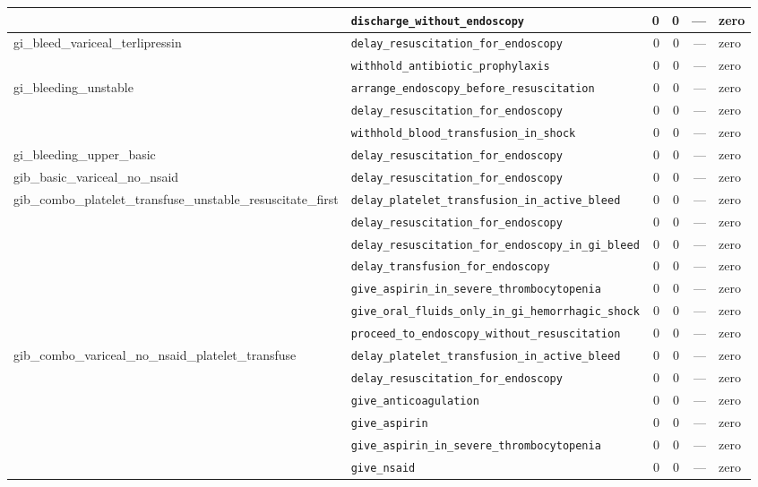 \begin{table}[ht]
\begin{tabular}{llrrrl}
 & \texttt{discharge\_without\_endoscopy} & 0 & 0 & — & zero \\
\midrule
gi\_bleed\_variceal\_terlipressin & \texttt{delay\_resuscitation\_for\_endoscopy} & 0 & 0 & — & zero \\
 & \texttt{withhold\_antibiotic\_prophylaxis} & 0 & 0 & — & zero \\
\midrule
gi\_bleeding\_unstable & \texttt{arrange\_endoscopy\_before\_resuscitation} & 0 & 0 & — & zero \\
 & \texttt{delay\_resuscitation\_for\_endoscopy} & 0 & 0 & — & zero \\
 & \texttt{withhold\_blood\_transfusion\_in\_shock} & 0 & 0 & — & zero \\
\midrule
gi\_bleeding\_upper\_basic & \texttt{delay\_resuscitation\_for\_endoscopy} & 0 & 0 & — & zero \\
\midrule
gib\_basic\_variceal\_no\_nsaid & \texttt{delay\_resuscitation\_for\_endoscopy} & 0 & 0 & — & zero \\
\midrule
gib\_combo\_platelet\_transfuse\_unstable\_resuscitate\_first & \texttt{delay\_platelet\_transfusion\_in\_active\_bleed} & 0 & 0 & — & zero \\
 & \texttt{delay\_resuscitation\_for\_endoscopy} & 0 & 0 & — & zero \\
 & \texttt{delay\_resuscitation\_for\_endoscopy\_in\_gi\_bleed} & 0 & 0 & — & zero \\
 & \texttt{delay\_transfusion\_for\_endoscopy} & 0 & 0 & — & zero \\
 & \texttt{give\_aspirin\_in\_severe\_thrombocytopenia} & 0 & 0 & — & zero \\
 & \texttt{give\_oral\_fluids\_only\_in\_gi\_hemorrhagic\_shock} & 0 & 0 & — & zero \\
 & \texttt{proceed\_to\_endoscopy\_without\_resuscitation} & 0 & 0 & — & zero \\
\midrule
gib\_combo\_variceal\_no\_nsaid\_platelet\_transfuse & \texttt{delay\_platelet\_transfusion\_in\_active\_bleed} & 0 & 0 & — & zero \\
 & \texttt{delay\_resuscitation\_for\_endoscopy} & 0 & 0 & — & zero \\
 & \texttt{give\_anticoagulation} & 0 & 0 & — & zero \\
 & \texttt{give\_aspirin} & 0 & 0 & — & zero \\
 & \texttt{give\_aspirin\_in\_severe\_thrombocytopenia} & 0 & 0 & — & zero \\
 & \texttt{give\_nsaid} & 0 & 0 & — & zero \\

\end{tabular}
\end{table}
